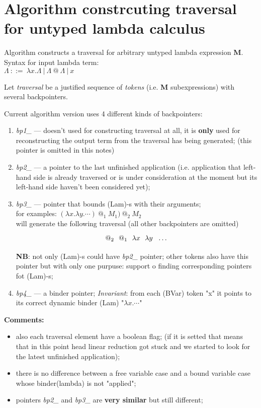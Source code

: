 \documentclass[a4paper, 12pt]{article} %
\newcommand{\tikzmark}[3][]{\tikz[remember picture,baseline] \node [inner xsep=0pt,anchor=base,#1](#2) {#3};}
\begin{document}
\section{Algorithm constrcuting traversal for untyped lambda calculus}
Algorithm constructs a traversal for arbitrary untyped lambda expression \textbf{M}.\\
Syntax for input lambda term:\\
$\Lambda\ ::=\ \lambda x . \Lambda\ |\ \Lambda\ @\ \Lambda\ |\ x$

Let \textit{traversal} be a 
justified sequence of \textit{tokens} (i.e. \textbf{M} subexpressions) with several backpointers.

Current algorithm version uses 4 different kinds of backpointers:
\begin{enumerate}
\item \textit{bp1\_} --- doesn't used for constructing traversal at all, it is \textbf{only} used for reconstructing the output term from the traversal has being generated; (this pointer is omitted in this notes)
\item \textit{bp2\_} --- a pointer to the last unfinished application (i.e. application that left-hand side is already traversed or is under consideration at the moment but its left-hand side haven't been considered yet);
\item \textit{bp3\_} --- pointer that bounds (Lam)-s with their arguments;\\
for examples: $(\lambda x . \lambda y . \cdots)\ @_1\ M_1)\ @_2\ M_2$\\will generate the following traversal (all other backpointers are omitted)
\[\tikzmark{1}{$@_2$}\ \ \tikzmark{2}{$@_1$}\ \ \tikzmark{3}{$\lambda x$}\ \ \tikzmark{4}{$\lambda y$}\ \ \dots \]
\textbf{NB}: not only (Lam)-s could have \textit{bp2\_} pointer; other tokens also have this pointer but with only one purpuse: support o finding corresponding pointers fot (Lam)-s;
\item \textit{bp4\_} --- a binder pointer; \textit{Invariant}: from each (BVar) token "x" it points to its correct dynamic binder (Lam) "$\lambda x . \cdots$"
\end{enumerate}

\textbf{Comments:}
\begin{itemize}
\item also each traversal element have a boolean flag; (if it is setted that means that in this point head linear reduction got stuck and we started to look for the latest unfinished application);
\item there is no difference between a free variable case and a bound variable case whose binder(lambda) is not "applied";
\item pointers \textit{bp2\_} and \textit{bp3\_} are \textbf{very similar} but still different;
\end{itemize}
\end{document}
